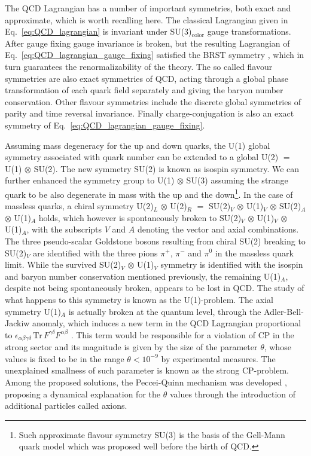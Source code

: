 The QCD Lagrangian has a number of important symmetries, both exact and approximate,
which is worth recalling here.
The classical Lagrangian given in Eq.~\ref{eq:QCD_lagrangian} is invariant under SU(3)$_{\text{color}}$
gauge transformations. After gauge fixing gauge invariance is broken, but the resulting Lagrangian of 
Eq.~\ref{eq:QCD_lagrangian_gauge_fixing} satisfied the BRST symmetry \cite{Becchi:1975nq, Tyutin:1975qk},
which in turn guarantees the renormalizability of the theory.
The so called flavour symmetries are also exact symmetries of QCD, 
acting through a global phase transformation of each quark field separately and giving
the baryon number conservation. 
Other flavour symmetries include the discrete global symmetries of parity and time reversal invariance.
Finally charge-conjugation is also an exact symmetry of Eq.~\ref{eq:QCD_lagrangian_gauge_fixing}. 

Assuming mass degeneracy for the up and down quarks, the U(1) global symmetry associated with quark number 
can be extended to a global U(2) $=$ U(1) $\otimes$ SU(2). The new symmetry SU(2) is known as isospin symmetry.
We can further enhanced the symmetry group to U(1) $\otimes$ SU(3) assuming the strange quark to be also 
degenerate in mass with the up and the down\footnote{Such approximate flavour symmetry SU(3) is the basis of the Gell-Mann
quark model \cite{GellMann:1964nj} which was proposed well before the birth of QCD.}.
In the case of massless quarks, a chiral symmetry
U(2)$_{L}$ $\otimes$ U(2)$_R$ $=$ SU(2)$_V$ $\otimes$ U(1)$_V$ $\otimes$  SU(2)$_A$ $\otimes$ U(1)$_A$ 
holds, which however is spontaneously broken to SU(2)$_V$ $\otimes$ U(1)$_V$ $\otimes$ U(1)$_A$,
with the subscripts $V$ and $A$ denoting the vector and axial combinations.
The three pseudo-scalar Goldstone bosons resulting from chiral SU(2) breaking 
to SU(2)$_V$ are identified with the three pions $\pi^+$, $\pi^-$ and $\pi^0$
in the massless quark limit. 
While the survived SU(2)$_V$ $\otimes$ U(1)$_V$ symmetry is identified with the isospin and baryon number 
conservation mentioned previously, the remaining U(1)$_A$, despite not being spontaneously broken,
appears to be lost in QCD. The study of what happens to this symmetry is known as the U(1)-problem.
The axial symmetry U(1)$_A$ is actually broken at the quantum level, through the Adler-Bell-Jackiw anomaly,
which induces a new term in the QCD Lagrangian proportional to 
$\epsilon_{\alpha\beta\gamma\delta}\, \text{Tr}\, F^{\gamma\delta} F^{\alpha\beta}$ .
This term would be responsible for a violation of CP in the strong sector and 
its magnitude is given by the size of the parameter $\theta$, whose values is fixed to be in the range
$\theta<10^{-9}$ by experimental measures. The unexplained smallness of such parameter is known as the strong CP-problem.
Among the proposed solutions, the Peccei-Quinn mechanism was developed \cite{Peccei:1977ur}, proposing a dynamical explanation
for the $\theta$ values through the introduction of additional particles called axions. 

